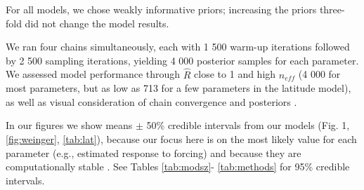 \documentclass{article}
\begin{document}
\noindent For all models, we chose weakly informative priors; increasing the priors three-fold did not change the model results. 

We ran four chains simultaneously, each with 1 500 warm-up iterations followed by 2 500 sampling iterations, yielding 4 000 posterior samples for each parameter. We assessed model performance through $\hat{R}$ close to 1 and high $n_{eff}$ (4 000 for most parameters, but as low as 713 for a few parameters in the latitude model), as well as visual consideration of chain convergence and posteriors \citep{BDA}. 

In our figures  we show means $\pm$ 50\% credible intervals from our models (Fig. 1, \ref{fig:weinger}, \ref{tab:lat}), because our focus here is on the most likely value for each parameter (e.g., estimated response to forcing) and because they are computationally stable \citep{BDA,Carpenter:2016aa}. See Tables \ref{tab:modsz}- \ref{tab:methods} for 95\% credible intervals. 
\end{document}
